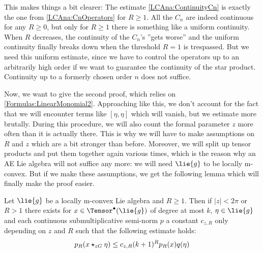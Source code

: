 \begin{remark}
	This makes things a bit clearer: The estimate \ref{LCAna:ContinuityCn} is 
	exactly the one from \eqref{LCAna:CnOperators} for $R \geq 1$. All the 
	$C_n$ are indeed continuous for any $R \geq 0$, but only for $R \geq 1$ 
	there is something like a uniform continuity. When $R$ decreases, the 
	continuity of the $C_n$'s ''gets worse'' and the uniform continuity 
	finally breaks down when the threshold $R = 1$ is trespassed. But we need
	this uniform estimate, since we have to control the operators up to an 
	arbitrarily high order if we want to guarantee the continuity of the 
	star product. Continuity up to a formerly chosen order $n$ does not 
	suffice.
\end{remark}



Now, we want to give the second proof, which relies on 
\eqref{Formulas:LinearMonomial2}. Approaching like this, we don't account for 
the fact that we will encounter terms like $[\eta, \eta]$ which will vanish, 
but we estimate more brutally. During this procedure, we will also count the 
formal parameter $z$ more often than it is actually there. This is why we will 
have to make assumptions on $R$ and $z$ which are a bit stronger than before. 
Moreover, we will split up tensor products and put them together again various 
times, which is the reason why an AE Lie algebra will not suffice any more: we 
will need $\lie{g}$ to be locally m-convex. But if we make these assumptions, 
we get the following lemma which will finally make the proof easier.
\begin{lemma}
    \label{Lemma:LCAna:PreContinuity2}%
    Let $\lie{g}$ be a locally m-convex Lie algebra and $R \geq1$. 
    Then if $|z| < 2 \pi$ or $R >1$ there exists for $x \in
    \Tensor^{\bullet}(\lie{g})$ of degree at most $k$, $\eta \in \lie{g}$
    and each continuous submultiplicative semi-norm $p$ a constant $c_{z,R}$ 
    only depending on $z$ and $R$ such that the following estimate holds:
    \begin{equation}
        \label{LCAna:PreContinuity2}
        p_R(x \star_{zG} \eta)
        \leq
        c_{z,R} (k+1)^R p_R(x) q(\eta)
    \end{equation}
\end{lemma}

